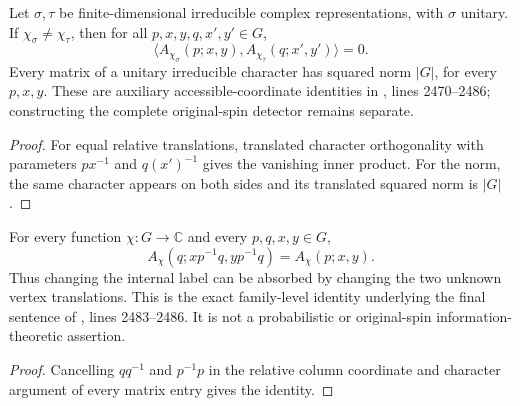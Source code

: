 \begin{lemma}
    \label{thm:peps_regular_charge_coordinates_orthogonality}
    \leanok
    Let $\sigma,\tau$ be finite-dimensional irreducible complex representations,
    with $\sigma$ unitary. If $\chi_\sigma\ne\chi_\tau$, then for all
    $p,x,y,q,x',y'\in G$,
    \[
        \langle A_{\chi_\sigma}(p;x,y),
        A_{\chi_\tau}(q;x',y')\rangle=0.
    \]
    Every matrix of a unitary irreducible character has squared norm $|G|$,
    for every $p,x,y$. These are auxiliary accessible-coordinate identities
    in \cite[charge-detection proof]{Schuch2010PEPS}, lines 2470--2486;
    constructing the complete original-spin detector remains separate.
\end{lemma}
\begin{proof}\leanok
    For equal relative translations, translated character orthogonality
    with parameters $px^{-1}$ and $q(x')^{-1}$ gives the vanishing inner
    product. For the norm,
    the same character appears on both sides and its translated squared norm
    is $|G|$.
\end{proof}

\begin{lemma}
    \label{thm:peps_regular_charge_coordinates_internal_label}
    \leanok
    For every function $\chi:G\to\mathbb C$ and every $p,q,x,y\in G$,
    \[
        A_\chi(q;xp^{-1}q,yp^{-1}q)=A_\chi(p;x,y).
    \]
    Thus changing the internal label can be absorbed by changing the two
    unknown vertex translations. This is the exact family-level identity
    underlying the final sentence of
    \cite[charge-detection proof]{Schuch2010PEPS}, lines 2483--2486.
    It is not a probabilistic or original-spin information-theoretic assertion.
\end{lemma}

\begin{proof}\leanok
    Cancelling $q q^{-1}$ and $p^{-1}p$ in the relative column coordinate and
    character argument of every matrix entry gives the identity.
\end{proof}

